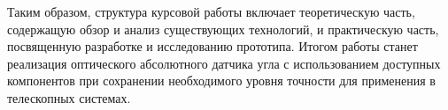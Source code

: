 Таким образом, структура курсовой работы включает теоретическую часть, содержащую обзор и анализ существующих технологий, и практическую часть, посвященную разработке и исследованию прототипа. Итогом работы станет реализация оптического абсолютного датчика угла с использованием доступных компонентов при сохранении необходимого уровня точности для применения в телескопных системах.  